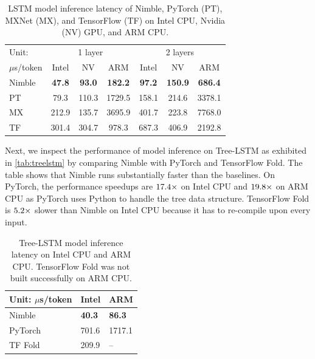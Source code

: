 \begin{table}[t]
\centering
\small
\begin{tabular}{p{0.9cm}|ccc|ccc}
\toprule
Unit: & \multicolumn{3}{c|}{1 layer} & \multicolumn{3}{c}{2 layers} \\
$\mu$s/token & Intel & NV & ARM & Intel & NV & ARM \\ \midrule
Nimble & \bf{47.8} & \bf{93.0} & \bf{182.2} & \bf{97.2} & \bf{150.9} & \bf{686.4} \\
PT & 79.3 & 110.3 & 1729.5 & 158.1 & 214.6 & 3378.1 \\
MX  & 212.9 & 135.7 & 3695.9 & 401.7 & 223.8 & 7768.0 \\
TF & 301.4 & 304.7 & 978.3 & 687.3 & 406.9 & 2192.8 \\
\bottomrule
\end{tabular}
\caption{LSTM model inference latency of Nimble, PyTorch (PT), MXNet (MX), and TensorFlow (TF) on Intel CPU, Nvidia (NV) GPU, and ARM CPU.}
\label{tab:lstm}
\end{table}

Next, we inspect the performance of model inference on Tree-LSTM as exhibited in \autoref{tab:treelstm} by comparing Nimble with PyTorch and TensorFlow Fold. The table shows that Nimble runs substantially faster than the baselines. On PyTorch, the performance speedups are $\fpeval{round(701.1/40.3, 1)}\times$ on Intel CPU and $\fpeval{round(1711.1/86.3, 1)}\times$ on ARM CPU as PyTorch uses Python to handle the tree data structure. TensorFlow Fold is $\fpeval{round(209.9/40.3, 1)}\times$ slower than Nimble on Intel CPU because it has to re-compile upon every input.

\begin{table}[t]
\centering
\begin{tabular}{l|ll}
\toprule
Unit: $\mu$s/token        & Intel     & ARM \\ \midrule
Nimble  & \bf{40.3}  & \bf{86.3}  \\
PyTorch & 701.6 & 1717.1  \\
TF Fold & 209.9 & --  \\
\bottomrule
\end{tabular}
\caption{Tree-LSTM model inference latency on Intel CPU and ARM CPU. TensorFlow Fold was not built successfully on ARM CPU.}
\label{tab:treelstm}
\end{table}

